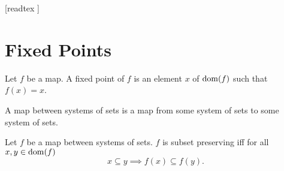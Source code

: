 \documentclass[10pt]{article}
\begin{document}
  \begin{imports}
    \begin{forthel}

      [readtex ]

    \end{forthel}
  \end{imports}


  \section{Fixed Points}

  \begin{forthel}
    \begin{definition}
      Let $f$ be a map.
      A fixed point of $f$ is an element $x$ of $\operatorname{dom}(f)$ such that $f(x) = x$.
    \end{definition}
  \end{forthel}

  \begin{forthel}
    \begin{definition}
      A map between systems of sets is a map from some system of sets to some
      system of sets.
    \end{definition}
  \end{forthel}

  \begin{forthel}
    \begin{definition}
      Let $f$ be a map between systems of sets.
      $f$ is subset preserving iff for all $x, y \in \operatorname{dom}(f)$
      \[ x \subseteq y \implies f(x) \subseteq f(y). \]
    \end{definition}
  \end{forthel}
\end{document}
